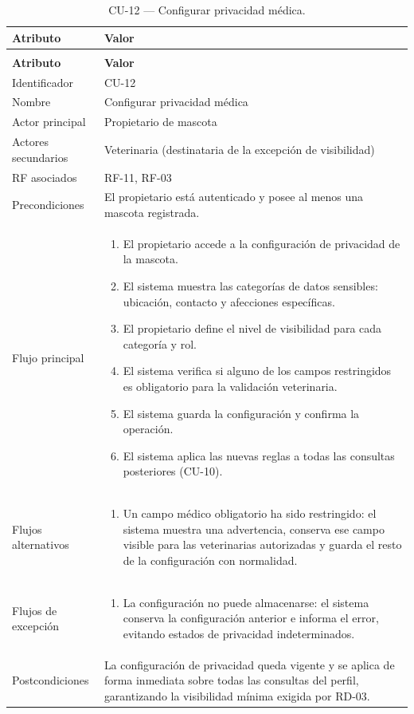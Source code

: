 \documentclass[journal,onecolumn]{IEEEtran}
\makeatletter
\newenvironment{atributos}[2]{%
	\small
	\begin{longtable}{@{}>{\raggedright\arraybackslash}p{4.2cm} >{\raggedright\arraybackslash}p{11.2cm}@{}}
		\caption{#2}\label{tab:#1}\\
		\toprule
		\textbf{Atributo} & \textbf{Valor} \\
		\midrule
		\endfirsthead
		\multicolumn{2}{@{}l}{\small\itshape (continuación)}\\
		\toprule
		\textbf{Atributo} & \textbf{Valor} \\
		\midrule
		\endhead
		\bottomrule
		\endlastfoot
	}{%
	\end{longtable}
	\normalsize
}
\makeatother
\begin{document}
	\begin{atributos}{CU-12}{CU-12 --- Configurar privacidad médica.}
		Identificador & CU-12 \\
		Nombre & Configurar privacidad médica \\
		Actor principal & Propietario de mascota \\
		Actores secundarios & Veterinaria (destinataria de la excepción de visibilidad) \\
		RF asociados & RF-11, RF-03 \\
		Precondiciones & El propietario está autenticado y posee al menos una mascota registrada. \\
		Flujo principal &
		\begin{enumerate}[leftmargin=*, nosep]
			\item El propietario accede a la configuración de privacidad de la mascota.
			\item El sistema muestra las categorías de datos sensibles: ubicación, contacto y afecciones específicas.
			\item El propietario define el nivel de visibilidad para cada categoría y rol.
			\item El sistema verifica si alguno de los campos restringidos es obligatorio para la validación veterinaria.
			\item El sistema guarda la configuración y confirma la operación.
			\item El sistema aplica las nuevas reglas a todas las consultas posteriores (CU-10).
		\end{enumerate} \\
		Flujos alternativos &
		\begin{enumerate}[leftmargin=*, nosep]
			\item[4.1] Un campo médico obligatorio ha sido restringido: el sistema muestra una advertencia, conserva ese campo visible para las veterinarias autorizadas y guarda el resto de la configuración con normalidad.
		\end{enumerate} \\
		Flujos de excepción &
		\begin{enumerate}[leftmargin=*, nosep]
			\item[5.1] La configuración no puede almacenarse: el sistema conserva la configuración anterior e informa el error, evitando estados de privacidad indeterminados.
		\end{enumerate} \\
		Postcondiciones & La configuración de privacidad queda vigente y se aplica de forma inmediata sobre todas las consultas del perfil, garantizando la visibilidad mínima exigida por RD-03. \\
	\end{atributos}
	
\end{document}
